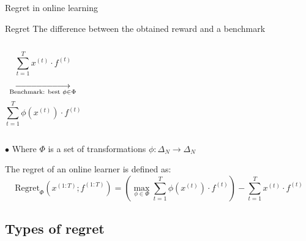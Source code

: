 \documentclass[aspectratio=169,xcolor=dvipsnames,t]{beamer}
\DeclareMathOperator*{\looongrightarrow}{%
  \DOTSB\relbar\joinrel\relbar\joinrel\relbar\joinrel\relbar\joinrel\relbar\joinrel\relbar\joinrel\relbar\joinrel\relbar\joinrel\relbar\joinrel\rightarrow
}
\begin{document}
\begin{frame}[label=current]{Regret in online learning}
    \begin{alertblock}{Regret}
        The difference between the obtained reward and a benchmark
    \end{alertblock}
    \begin{columns}
        \pause {}
        \begin{equation*}
            \sum_{t=1}^T x^{(t)}\cdot f^{(t)}
        \end{equation*}
        \pause {}
        \begin{equation*}
            \looongrightarrow_{\text{Benchmark: best }\phi\in \Phi}
        \end{equation*}
        \begin{equation*}
            \sum_{t=1}^T \phi(x^{(t)})\cdot f^{(t)}
        \end{equation*}
    \end{columns}
    \pause
    \vspace{0.4cm}
    $\bullet$ Where $\Phi$ is a set of transformations $\phi:\Delta_N\rightarrow\Delta_N$\\
    \pause
    \begin{definition}
        The regret of an online learner is defined as:
        \begin{equation*}
            \text{Regret}_{\Phi}(x^{(1:T)};f^{(1:T)}) = \left(\max_{\phi\in\Phi} \sum_{t=1}^T \phi(x^{(t)})\cdot f^{(t)}\right) - \sum_{t=1}^T x^{(t)}\cdot f^{(t)}
        \end{equation*}
    \end{definition}
\end{frame}

\subsection{Types of regret}
\end{document}
